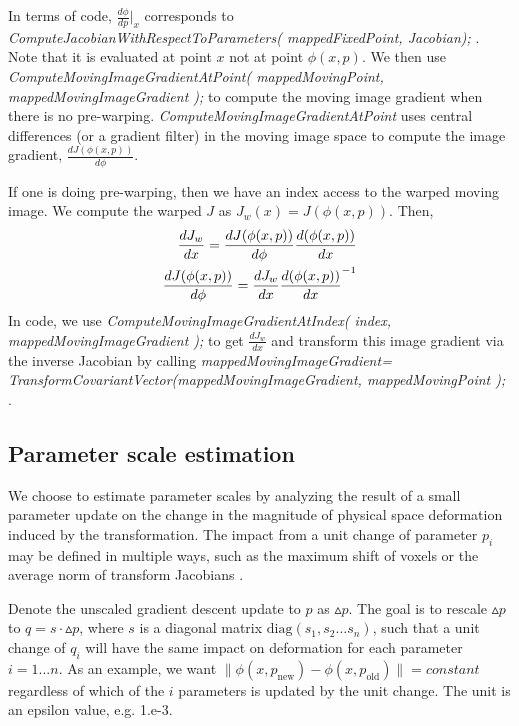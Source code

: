 \documentclass{frontiersSCNS}
\begin{document}
In terms of code, $\frac{d\phi}{dp}|_x$ corresponds to {\em
ComputeJacobianWithRespectToParameters( mappedFixedPoint, Jacobian);
}.  Note that it is evaluated at point $x$ not at point $\phi(x,p)$.  We
then use {\em
ComputeMovingImageGradientAtPoint( mappedMovingPoint,
mappedMovingImageGradient );} to compute the moving image gradient
when there is no pre-warping.  {\em ComputeMovingImageGradientAtPoint} uses central
differences (or a gradient filter) in the moving image space to
compute the image gradient, $\frac{dJ(\phi(x,p))}{d\phi}$.

 If one is doing pre-warping, then we have an index access to the
 warped moving image.  We compute the warped $J$ as
 $J_w(x)=J(\phi(x,p))$.  Then,
\begin{eqnarray}
\frac{dJ_w}{dx}=\frac{dJ(\phi(x,p))}{d\phi}\frac{d(\phi(x,p))}{dx} \\ \notag
\frac{dJ(\phi(x,p))}{d\phi}=\frac{dJ_w}{dx}{\frac{d(\phi(x,p))}{dx}}^{-1} 
\end{eqnarray}
In code, we use {\em ComputeMovingImageGradientAtIndex( index,
mappedMovingImageGradient );} to get $\frac{dJ_w}{dx}$ and transform
this image gradient via the inverse Jacobian by calling 
{\em mappedMovingImageGradient=
TransformCovariantVector(mappedMovingImageGradient, mappedMovingPoint ); }.


\subsection{Parameter scale estimation}
We choose to estimate parameter scales by analyzing the result of a
small parameter update on the change in the magnitude of physical space deformation
induced by the transformation.  The impact from a unit change of
parameter $p_i$ may be defined in multiple ways, such as the maximum shift of
voxels or the average norm of transform Jacobians \cite{Jenkinson2001}.

Denote the unscaled gradient descent update to $p$ as $\vartriangle
p$.  The goal is to rescale $\vartriangle p$ to $q = s \cdot \vartriangle p$, where $s$ is a diagonal
matrix $\text{diag} (s_1, s_2 \ldots s_n)$, such that a unit change of $q_i$ will have
the same impact on deformation for each parameter $i = 1... n$.   
As an example, we want $ \| \phi(x,p_{\text{new}}) -
\phi(x,p_\text{old}) \| = constant $ regardless of which of the
$i$ parameters is updated by the unit change.  The unit is an epsilon
value, e.g. 1.e-3.
\end{document}
